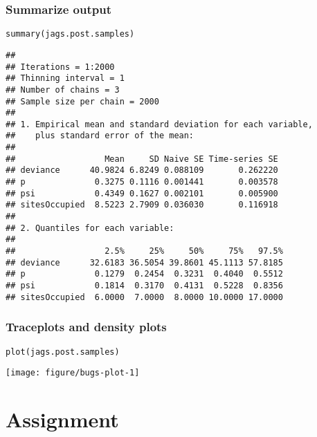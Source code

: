 \documentclass[color=usenames,dvipsnames]{beamer}\usepackage[]{graphicx}\usepackage[]{color}
\makeatletter
\newcommand{\hlstd}[1]{\textcolor[rgb]{0,0,0}{#1}}%
\newcommand{\hlkwd}[1]{\textcolor[rgb]{0.004,0.004,0.506}{#1}}%
\newenvironment{kframe}{%
 \def\at@end@of@kframe{}%
 \ifinner\ifhmode%
  \def\at@end@of@kframe{\end{minipage}}%
  \begin{minipage}{\columnwidth}%
 \fi\fi%
 \def\FrameCommand##1{\hskip\@totalleftmargin \hskip-\fboxsep
 \colorbox{shadecolor}{##1}\hskip-\fboxsep
     \hskip-\linewidth \hskip-\@totalleftmargin \hskip\columnwidth}%
 \MakeFramed {\advance\hsize-\width
   \@totalleftmargin\z@ \linewidth\hsize
   \@setminipage}}%
 {\par\unskip\endMakeFramed%
 \at@end@of@kframe}
\newenvironment{knitrout}{}{} %
\makeatother
\begin{document}
\begin{frame}[fragile]
  \frametitle{Summarize output}
\begin{knitrout}\scriptsize
{}\color{fgcolor}\begin{kframe}
\begin{alltt}
\hlkwd{summary}\hlstd{(jags.post.samples)}
\end{alltt}
\begin{verbatim}
## 
## Iterations = 1:2000
## Thinning interval = 1 
## Number of chains = 3 
## Sample size per chain = 2000 
## 
## 1. Empirical mean and standard deviation for each variable,
##    plus standard error of the mean:
## 
##                  Mean     SD Naive SE Time-series SE
## deviance      40.9824 6.8249 0.088109       0.262220
## p              0.3275 0.1116 0.001441       0.003578
## psi            0.4349 0.1627 0.002101       0.005900
## sitesOccupied  8.5223 2.7909 0.036030       0.116918
## 
## 2. Quantiles for each variable:
## 
##                  2.5%     25%     50%     75%   97.5%
## deviance      32.6183 36.5054 39.8601 45.1113 57.8185
## p              0.1279  0.2454  0.3231  0.4040  0.5512
## psi            0.1814  0.3170  0.4131  0.5228  0.8356
## sitesOccupied  6.0000  7.0000  8.0000 10.0000 17.0000
\end{verbatim}
\end{kframe}
\end{knitrout}
\end{frame}




\begin{frame}[fragile]
  \frametitle{Traceplots and density plots}
\begin{knitrout}\footnotesize
{}\color{fgcolor}\begin{kframe}
\begin{alltt}
\hlkwd{plot}\hlstd{(jags.post.samples)}
\end{alltt}
\end{kframe}

{\centering \texttt{[image: figure/bugs-plot-1]} 

}


\end{knitrout}
\end{frame}


\section{Assignment}
\end{document}
